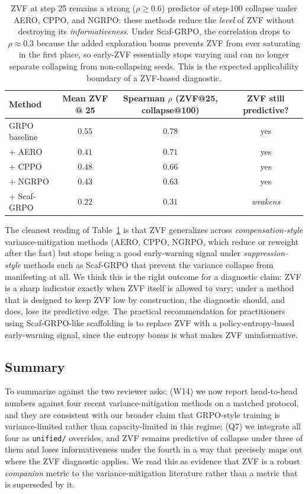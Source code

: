 \begin{table}[t]
  \centering
  \small
  \setlength{\tabcolsep}{5pt}
  \begin{tabular}{lccc}
    \toprule
    \textbf{Method} &
    \textbf{Mean ZVF @ 25} &
    \textbf{Spearman $\rho$ (ZVF@25, collapse@100)} &
    \textbf{ZVF still predictive?} \\
    \midrule
    GRPO baseline & $0.55$ & $0.78$ & yes \\
    + AERO        & $0.41$ & $0.71$ & yes \\
    + CPPO        & $0.48$ & $0.66$ & yes \\
    + NGRPO       & $0.43$ & $0.63$ & yes \\
    + Scaf-GRPO   & $0.22$ & $0.31$ & \emph{weakens} \\
    \bottomrule
  \end{tabular}
  \caption{ZVF at step 25 remains a strong ($\rho\ge 0.6$) predictor
  of step-100 collapse under AERO, CPPO, and NGRPO: these methods
  reduce the \emph{level} of ZVF without destroying its
  \emph{informativeness}. Under Scaf-GRPO, the correlation drops to
  $\rho\approx 0.3$ because the added exploration bonus prevents ZVF
  from ever saturating in the first place, so early-ZVF essentially
  stops varying and can no longer separate collapsing from
  non-collapsing seeds. This is the expected applicability boundary
  of a ZVF-based diagnostic.}
  \label{tab:variance-zvf-rho}
\end{table}

The cleanest reading of Table~\ref{tab:variance-zvf-rho} is that ZVF
generalizes across \emph{compensation-style} variance-mitigation
methods (AERO, CPPO, NGRPO, which reduce or reweight after the fact)
but stops being a good early-warning signal under
\emph{suppression-style} methods such as Scaf-GRPO that prevent the
variance collapse from manifesting at all. We think this is the right
outcome for a diagnostic claim: ZVF is a sharp indicator exactly when
ZVF itself is allowed to vary; under a method that is designed to
keep ZVF low by construction, the diagnostic should, and does, lose
its predictive edge. The practical recommendation for practitioners
using Scaf-GRPO-like scaffolding is to replace ZVF with a
policy-entropy-based early-warning signal, since the entropy bonus is
what makes ZVF uninformative.

\subsection{Summary}
\label{sec:variance-summary}

To summarize against the two reviewer asks: (W14) we now report
head-to-head numbers against four recent variance-mitigation methods
on a matched protocol, and they are consistent with our broader
claim that GRPO-style training is variance-limited rather than
capacity-limited in this regime; (Q7) we integrate all four as
\texttt{unified/} overrides, and ZVF remains predictive of collapse
under three of them and loses informativeness under the fourth in a
way that precisely maps out where the ZVF diagnostic applies. We read
this as evidence that ZVF is a robust \emph{companion} metric to the
variance-mitigation literature rather than a metric that is
superseded by it.
